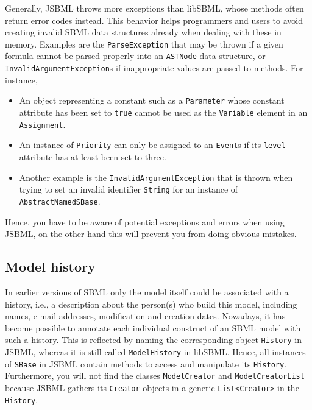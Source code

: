 \documentclass[
  BCOR12mm,
  letterpaper,
  11pt,
  headsepline,
  pointlessnumbers,
  tablecaptionabove,
  onelinecaption,
  headinclude,
  appendixprefix,
  idxtotoc,
  bibtotoc,
  twoside,
  titlepage
]{scrartcl}
\begin{document}
Generally, JSBML throws more exceptions than libSBML, whose methods often return error codes instead. This behavior helps
programmers and users to avoid creating invalid SBML data structures already
when dealing with these in memory. Examples are the \texttt{ParseException}
 that
may be thrown if a given formula cannot be parsed properly into an
\texttt{ASTNode} data structure, or \texttt{InvalidArgumentException}s
 if inappropriate values are passed to methods. For instance,
\begin{itemize}
 \item An object representing a constant such as a
 \texttt{Parameter}
 whose constant attribute has been set to
\texttt{true} cannot be used as the \texttt{Variable} element in an
\texttt{Assignment}.
 \item An instance of \texttt{Priority} can only be assigned to an \texttt{Event}s if its \texttt{level} attribute has at least been set to three.
 \item Another example is the \texttt{InvalidArgumentException} that
is thrown when trying to set an invalid identifier \texttt{String} for an instance of \texttt{AbstractNamedSBase}.
\end{itemize}
Hence, you have to be aware of potential
exceptions and errors when using JSBML, on the other hand this will
prevent you from doing obvious mistakes.


\subsection{Model history}

In earlier versions of SBML only the model itself could be associated
with a history, i.e., a description about the person(s) who build this model,
including names, e-mail addresses, modification and creation dates. Nowadays, it
has become possible to annotate each individual construct of an SBML model with
such a history. This is reflected by naming the corresponding object
\texttt{History}
in JSBML, whereas it is still called
\texttt{ModelHistory} in libSBML. Hence,
all instances of \texttt{SBase} in JSBML
 contain methods to access and
manipulate its \texttt{History}. Furthermore, you will not find the classes
\texttt{ModelCreator} and \texttt{ModelCreatorList} because
JSBML
gathers its \texttt{Creator} objects
in a generic \texttt{List<Creator>} in the
\texttt{History}.
\end{document}
